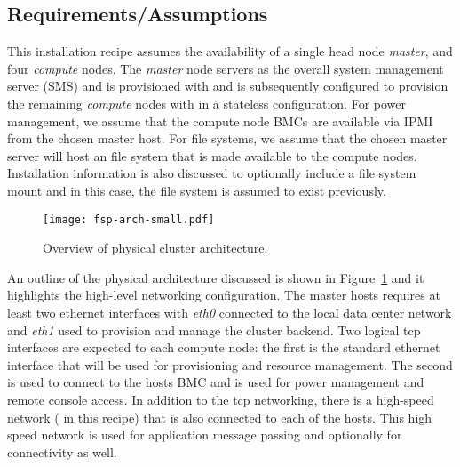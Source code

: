 \subsection{Requirements/Assumptions}
This installation recipe assumes the availability of a single head node {\em
master}, and four {\em compute} nodes. The {\em master} node servers as the
overall system management server (SMS) and is provisioned with \baseOS{} and is
subsequently configured to provision the remaining {\em compute} nodes with
\Warewulf{} in a stateless configuration. For power management, we assume that the
compute node BMCs are available via IPMI from the chosen master host. For file
systems, we assume that the chosen master server will host an \NFS{} file
system that is made available to the compute nodes. Installation information is
also discussed to optionally include a \Lustre{} file system mount and in this
case, the \Lustre{} file system is assumed to exist previously. 

\begin{figure}[hbt]
\center
\texttt{[image: fsp-arch-small.pdf]}
\vspace*{-0.2cm}
\caption{Overview of physical cluster architecture.} \label{fig:physical_arch}
\end{figure}
\mbox{}

An outline of the physical architecture discussed is shown in
Figure~\ref{fig:physical_arch} and it highlights the high-level networking
configuration. The master hosts requires at least two ethernet interfaces with
{\em eth0} connected to the local data center network and {\em eth1} used to
provision and manage the cluster backend.  Two logical tcp interfaces are
expected to each compute node: the first is the standard ethernet interface
that will be used for provisioning and resource management. The second is
used to connect to the hosts BMC and is used for power management and
remote console access.  In addition to the tcp networking, there is a
high-speed network (\InfiniBand{} in this recipe) that is also connected to
each of the hosts. This high speed network is used for application message
passing and optionally for \Lustre{} connectivity as well.

